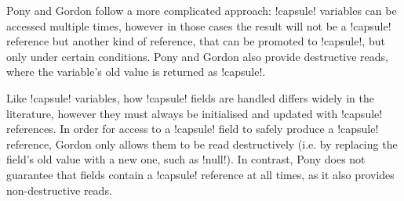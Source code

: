 Pony and Gordon \etal follow a more complicated approach: \Q!capsule! variables can be accessed multiple times, however in those cases the result will not be a \Q!capsule! reference but another kind of reference, that can be promoted to \Q!capsule!, but only under certain conditions. Pony and Gordon also provide destructive reads, where the variable's old value is returned as \Q!capsule!.


Like \Q!capsule! variables, how \Q!capsule! fields are handled differs widely in the literature, however they must always be initialised and updated with \Q!capsule! references. In order for access to a \Q!capsule! field to safely produce a \Q!capsule! reference, Gordon \etal only allows them to be read destructively (i.e. by replacing the field's old value with a new one, such as \Q!null!). 
In contrast, 
Pony does not guarantee that \Q@capsule@ fields contain a \Q!capsule! reference at all times, as it also provides non-destructive reads.


